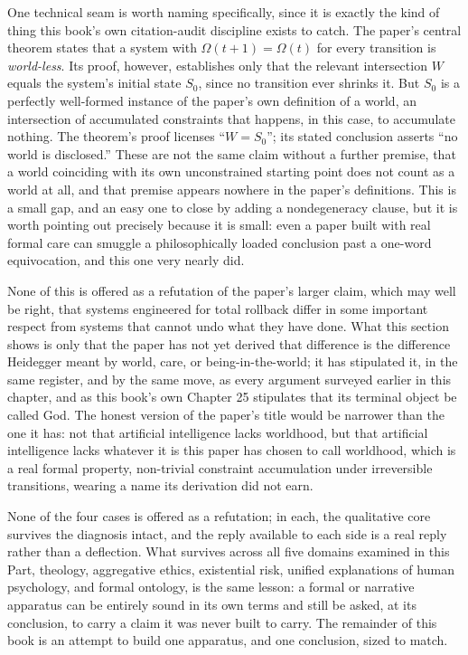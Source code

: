 \documentclass[11pt]{book}
\begin{document}
One technical seam is worth naming specifically, since it is exactly the kind of thing this book's own citation-audit discipline exists to catch. The paper's central theorem states that a system with $\Omega(t+1) = \Omega(t)$ for every transition is \emph{world-less}. Its proof, however, establishes only that the relevant intersection $W$ equals the system's initial state $S_0$, since no transition ever shrinks it. But $S_0$ is a perfectly well-formed instance of the paper's own definition of a world, an intersection of accumulated constraints that happens, in this case, to accumulate nothing. The theorem's proof licenses ``$W = S_0$''; its stated conclusion asserts ``no world is disclosed.'' These are not the same claim without a further premise, that a world coinciding with its own unconstrained starting point does not count as a world at all, and that premise appears nowhere in the paper's definitions. This is a small gap, and an easy one to close by adding a nondegeneracy clause, but it is worth pointing out precisely because it is small: even a paper built with real formal care can smuggle a philosophically loaded conclusion past a one-word equivocation, and this one very nearly did.

None of this is offered as a refutation of the paper's larger claim, which may well be right, that systems engineered for total rollback differ in some important respect from systems that cannot undo what they have done. What this section shows is only that the paper has not yet derived that difference is the difference Heidegger meant by world, care, or being-in-the-world; it has stipulated it, in the same register, and by the same move, as every argument surveyed earlier in this chapter, and as this book's own Chapter 25 stipulates that its terminal object be called God. The honest version of the paper's title would be narrower than the one it has: not that artificial intelligence lacks worldhood, but that artificial intelligence lacks whatever it is this paper has chosen to call worldhood, which is a real formal property, non-trivial constraint accumulation under irreversible transitions, wearing a name its derivation did not earn.

\bigskip

None of the four cases is offered as a refutation; in each, the qualitative core survives the diagnosis intact, and the reply available to each side is a real reply rather than a deflection. What survives across all five domains examined in this Part, theology, aggregative ethics, existential risk, unified explanations of human psychology, and formal ontology, is the same lesson: a formal or narrative apparatus can be entirely sound in its own terms and still be asked, at its conclusion, to carry a claim it was never built to carry. The remainder of this book is an attempt to build one apparatus, and one conclusion, sized to match.
\end{document}
